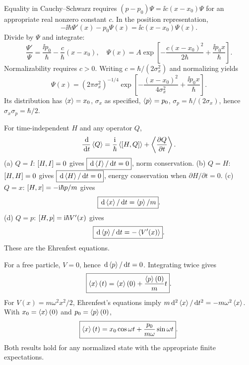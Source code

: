 Equality in Cauchy--Schwarz requires
$(p-p_0)\Psi=\ii c(x-x_0)\Psi$
for an appropriate real nonzero constant $c$.
In the position representation,
\begin{equation}
-\ii\hbar\Psi'(x)-p_0\Psi(x)
=\ii c(x-x_0)\Psi(x).
\end{equation}
Divide by $\Psi$ and integrate:
\begin{equation}
\frac{\Psi'}{\Psi}=\frac{\ii p_0}{\hbar}
-\frac{c}{\hbar}(x-x_0),
\quad
\Psi(x)=A\exp\left[
-\frac{c(x-x_0)^2}{2\hbar}+
\frac{\ii p_0x}{\hbar}\right].
\end{equation}
Normalizability requires $c>0$. Writing
$c=\hbar/(2\sigma_x^2)$ and normalizing yields
\begin{equation}
\boxed{\Psi(x)=
(2\pi\sigma_x^2)^{-1/4}
\exp\left[-\frac{(x-x_0)^2}{4\sigma_x^2}
+\frac{\ii p_0x}{\hbar}\right]}.
\end{equation}
Its distribution has
$\left\langle x\right\rangle=x_0$, $\sigma_x$ as specified,
$\left\langle p\right\rangle=p_0$, $\sigma_p=\hbar/(2\sigma_x)$,
hence $\sigma_x\sigma_p=\hbar/2$.

For time-independent $H$ and any operator $Q$,
\begin{equation}
\frac{\,\mathrm{d}}{\,\mathrm{d} t}\left\langle Q\right\rangle=
\frac{\mathrm{i}}{\hbar}\left\langle\left[H,Q\right]\right\rangle
+\left\langle\frac{\partial Q}{\partial t}\right\rangle.
\end{equation}
(a) $Q=I$: $\left[H,I\right]=0$ gives
$\boxed{\,\mathrm{d}\left\langle I\right\rangle/\,\mathrm{d} t=0}$, norm conservation.
(b) $Q=H$: $\left[H,H\right]=0$ gives
$\boxed{\,\mathrm{d}\left\langle H\right\rangle/\,\mathrm{d} t=0}$, energy conservation
when $\partial H/\partial t=0$.
(c) $Q=x$: $\left[H,x\right]=-\mathrm{i}\hbar p/m$ gives
\begin{equation}
\boxed{\,\mathrm{d}\left\langle x\right\rangle/\,\mathrm{d} t=\left\langle p\right\rangle/m}.
\end{equation}
(d) $Q=p$: $\left[H,p\right]=\mathrm{i}\hbar V'(x)$ gives
\begin{equation}
\boxed{\,\mathrm{d}\left\langle p\right\rangle/\,\mathrm{d} t=-\left\langle V'(x)\right\rangle}.
\end{equation}
These are the Ehrenfest equations.

For a free particle, $V=0$, hence
$\,\mathrm{d}\left\langle p\right\rangle/\,\mathrm{d} t=0$. Integrating twice gives
\begin{equation}
\boxed{\left\langle x\right\rangle(t)=\left\langle x\right\rangle(0)+
\frac{\left\langle p\right\rangle(0)}m t}.
\end{equation}
For $V(x)=m\omega^2x^2/2$, Ehrenfest's
equations imply
$m\,\mathrm{d}^2\left\langle x\right\rangle/\,\mathrm{d} t^2=-m\omega^2\left\langle x\right\rangle$.
With $x_0=\left\langle x\right\rangle(0)$ and $p_0=\left\langle p\right\rangle(0)$,
\begin{equation}
\boxed{\left\langle x\right\rangle(t)=x_0\cos\omega t+
\frac{p_0}{m\omega}\sin\omega t}.
\end{equation}
Both results hold for any normalized state
with the appropriate finite expectations.

